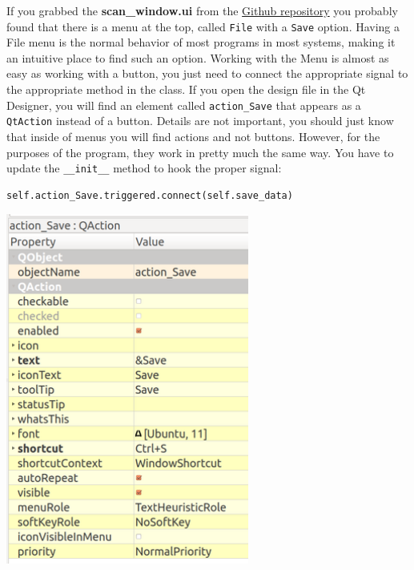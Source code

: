 If you grabbed the \textbf{scan\_window.ui} from the
\href{https://github.com/PFTL/SimpleDaq/tree/master/PythonForTheLab/View/GUI}{Github
repository} you probably found that there is a menu at the top, called
\texttt{File} with a \texttt{Save} option. Having a File menu is the
normal behavior of most programs in most systems, making it an intuitive
place to find such an option. Working with the Menu is almost as easy as
working with a button, you just need to connect the appropriate signal
to the appropriate method in the class. If you open the design file in
the Qt Designer, you will find an element called \texttt{action_Save}
that appears as a \texttt{QtAction} instead of a button. Details are not
important, you should just know that inside of menus you will find
actions and not buttons. However, for the purposes of the program, they
work in pretty much the same way. You have to update the
\texttt{__init__} method to hook the proper signal:

\begin{verbatim}
self.action_Save.triggered.connect(self.save_data)
\end{verbatim}

\begin{center}
\includegraphics[width=0.6\textwidth]{images/save_shortcut.png}
\end{center}

